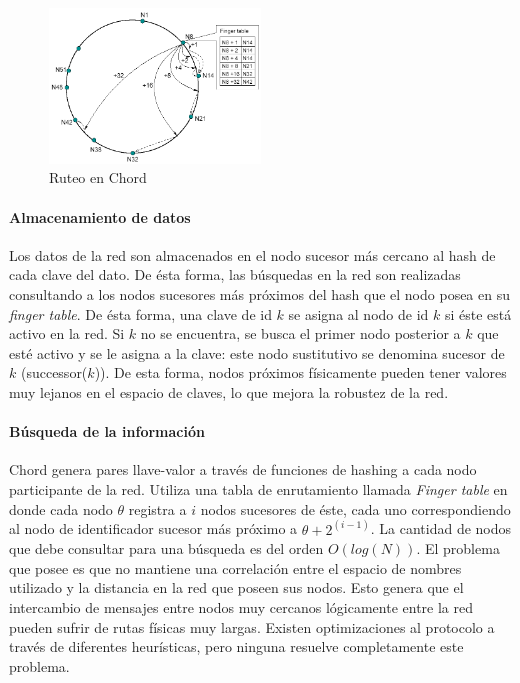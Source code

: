 \label{sec:chord}
\begin{figure}
\center
\includegraphics[width=0.5\textwidth]{img/chord-search}
\caption{Ruteo en Chord}
\label{fig:p2p_estructured_chord_search}
\end{figure}

\paragraph{Almacenamiento de datos}
 Los datos de la red son almacenados en el nodo sucesor
más cercano al hash de cada clave del dato. De ésta forma, las búsquedas en la red son
realizadas consultando a los nodos sucesores más próximos del hash que el nodo
posea en su \textit{finger table}.
De ésta forma, una clave de id $k$ se asigna al nodo de id $k$ si éste está activo en la
red. Si $k$ no se encuentra, se busca el primer nodo posterior a $k$ que esté activo y se le asigna a la
clave: este nodo sustitutivo se denomina sucesor de $k$ (successor($k$)). De
esta forma, nodos próximos físicamente pueden tener valores muy lejanos en el
espacio de claves, lo que mejora la robustez de la red.

\paragraph{Búsqueda de la información}
Chord genera pares llave-valor a través de funciones de
hashing a cada nodo participante de la red. Utiliza una tabla de enrutamiento
llamada \textit{Finger table} en donde cada nodo $\theta$ registra a $i$ nodos sucesores
de éste, cada uno correspondiendo al nodo de identificador sucesor más próximo a
$\theta + 2^{(i-1)}$.
 La cantidad de nodos que debe consultar para
una búsqueda es del orden $O(log(N))$. El problema que posee es que no mantiene una correlación entre el
espacio de nombres utilizado y la distancia en la red que poseen sus nodos.
Esto genera que el intercambio de mensajes entre nodos muy cercanos lógicamente
entre la red pueden sufrir de rutas físicas muy largas. Existen 
optimizaciones al protocolo a través de diferentes heurísticas,
pero ninguna resuelve completamente este problema.

